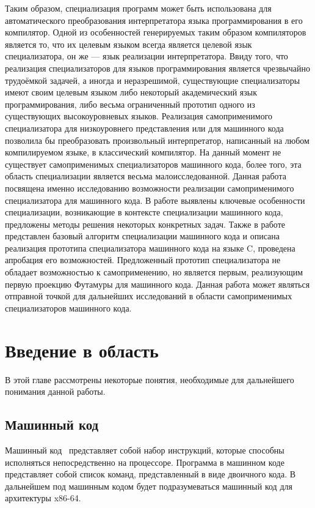 Таким образом, специализация программ может быть использована для автоматического преобразования
интерпретатора языка программирования в его компилятор.
Одной из особенностей генерируемых таким образом компиляторов является то, что их целевым языком
всегда является целевой язык специализатора, он же --- язык реализации интерпретатора.
Ввиду того, что реализация специализаторов для языков программирования является чрезвычайно трудоёмкой
задачей, а иногда и неразрешимой, существующие специализаторы имеют своим целевым языком либо
некоторый академический язык программирования, либо весьма ограниченный прототип одного из существующих
высокоуровневых языков.
Реализация самоприменимого специализатора для низкоуровнего представления или для машинного кода
позволила бы преобразовать произвольный интерпретатор, написанный на любом компилируемом языке, в
классический компилятор.
На данный момент не существует самоприменимых специализаторов машинного кода,
более того, эта область специализации является весьма малоисследованной.
Данная работа посвящена именно исследованию возможности реализации самоприменимого специализатора для
машинного кода.
В работе выявлены ключевые особенности специализации, возникающие в контексте специализации машинного
кода, предложены методы решения некоторых конкретных задач.
Также в работе представлен базовый алгоритм специализации машинного кода и
описана реализация прототипа специализатора машинного кода на языке \textsf{C},
проведена апробация его возможностей.
Предложенный прототип специализатора не обладает возможностью к самоприменению,
но является первым, реализующим первую проекцию Футамуры для машинного кода.
Данная работа может являться отправной точкой для дальнейших исследований в области самоприменимых
специализаторов машинного кода.


\section{ Введение в область}
В этой главе рассмотрены некоторые понятия, необходимые для дальнейшего понимания данной работы.

\subsection{ Машинный код}
Машинный код~\cite{AMD} представляет собой набор инструкций, которые способны исполняться непосредственно на процессоре. Программа в машинном коде представляет собой список команд, представленный в виде двоичного кода. В дальнейшем под машинным кодом будет подразумеваться машинный код для архитектуры x86-64.

